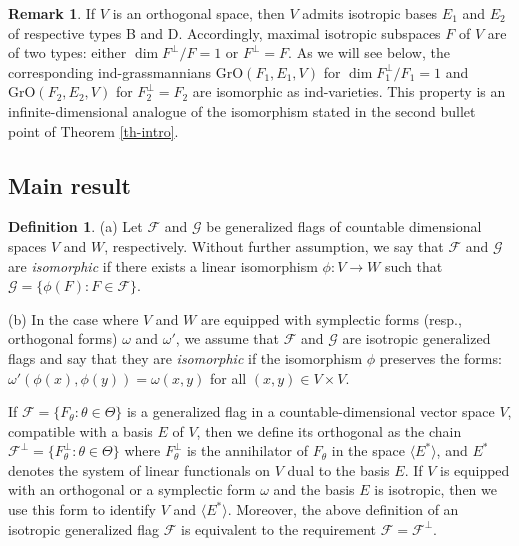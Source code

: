 \documentclass[12pt]{amsart}
\newcommand{\OGrass}{\mathrm{GrO}}
\theoremstyle{definition}
\newtheorem{definition}[theorem]{Definition}
\newtheorem{remark}[theorem]{Remark}
\begin{document}
\begin{remark} \label{remark-BDgrass}
If $V$ is an orthogonal space, then $V$ admits isotropic bases $E_1$ and $E_2$ of respective types B and D. Accordingly, maximal isotropic subspaces  $F$ of $V$ are of two types:
either $\dim F^\perp/F=1$ or $F^\perp=F$.
As we will see below, the corresponding ind-grassmannians
$\OGrass(F_1,E_1,V)$ for $\dim F_1^\perp/F_1=1$ and $\OGrass(F_2,E_2,V)$ for $F_2^\perp=F_2$ are isomorphic as ind-varieties.
This property is an infinite-dimensional analogue of the isomorphism stated in the second bullet point of Theorem \ref{th-intro}.
\end{remark}

\subsection{Main result} \label{section-2.2}

\begin{definition}
\label{definition-isomorphic}
(a) 
Let $\mathcal{F}$ and $\mathcal{G}$ be generalized flags of countable dimensional spaces $V$ and $W$, respectively. Without further assumption, we say that $\mathcal{F}$ and $\mathcal{G}$ are \emph{isomorphic} if there exists a linear isomorphism $\phi:V\to W$ such that $\mathcal{G}=\{\phi(F):F\in\mathcal{F}\}$.

(b) In the case where $V$ and $W$ are equipped with symplectic forms (resp., orthogonal forms) $\omega$ and $\omega'$, we assume that $\mathcal{F}$ and $\mathcal{G}$ are isotropic generalized flags and say that they are \emph{isomorphic}  if the isomorphism $\phi$
preserves the forms: $\omega'(\phi(x),\phi(y))=\omega(x,y)$ for all $(x,y)\in V\times V$.
\end{definition}

If $\mathcal{F}=\{F_\theta:\theta\in \Theta\}$ is a generalized flag in a countable-dimensional vector space $V$, compatible with a basis $E$ of $V$, then we define its orthogonal  as the chain $\mathcal{F}^\perp=\{F_\theta^\perp:\theta\in\Theta\}$
where $F_\theta^\perp$ is the annihilator of $F_\theta$ in the space $\langle E^*\rangle$, and $E^*$ denotes the system of linear functionals on $V$ dual to the basis $E$. If $V$ is equipped with an orthogonal or a symplectic form $\omega$ and the basis $E$ is isotropic, then we use this form to identify $V$ and $\langle E^*\rangle$. Moreover, the above definition of an isotropic generalized flag $\mathcal{F}$ is equivalent to the requirement $\mathcal{F}=\mathcal{F}^\perp$.
\end{document}

